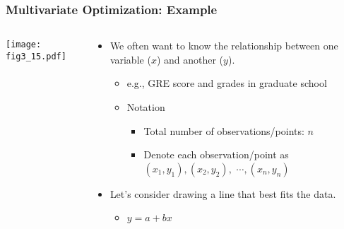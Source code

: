 \documentclass[pdflatex, 12pt]{beamer}
\begin{document}
\begin{frame}
\frametitle{Multivariate Optimization: Example}
\begin{columns}
\begin{column}{0.5\textwidth}
\centering
\texttt{[image: fig3\_15.pdf]}
\end{column}
\begin{column}{0.5\textwidth}
\begin{itemize}
\item We often want to know the relationship between one variable ($x$) and another ($y$).
 \begin{itemize}
 \item e.g., GRE score and grades in graduate school
 \item Notation
  \begin{itemize}
  \item Total number of observations/points: $n$
  \item Denote each observation/point as $(x_1, y_1), (x_2, y_2),$ $\cdots, (x_n, y_n)$
  \end{itemize}
 \end{itemize}
\vspace{0.4cm}
\item Let's consider drawing a line that best fits the data.
 \begin{itemize}
 \item $y = a + bx$
 \end{itemize}
\end{itemize}
\end{column}
\end{columns}
\end{frame}
\end{document}
